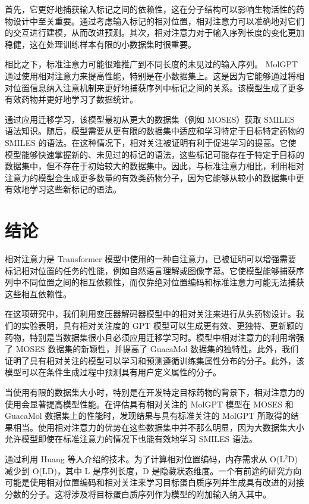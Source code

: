首先，它更好地捕获输入标记之间的依赖性，这在分子结构可以影响生物活性的药物设计中至关重要。通过考虑输入标记的相对位置，相对注意力可以准确地对它们的交互进行建模，从而改进预测。其次，相对注意力对于输入序列长度的变化更加稳健，这在处理训练样本有限的小数据集时很重要。

相比之下，标准注意力可能很难推广到不同长度的未见过的输入序列。 MolGPT 通过使用相对注意力来提高性能，特别是在小数据集上。这是因为它能够通过将相对位置信息纳入注意机制来更好地捕获序列中标记之间的关系。该模型生成了更多有效药物并更好地学习了数据统计。

通过应用迁移学习，该模型最初从更大的数据集（例如 MOSES）获取 SMILES 语法知识。随后，模型需要从更有限的数据集中适应和学习特定于目标特定药物的 SMILES 的语法。在这种情况下，相对关注被证明有利于促进学习的提高。它使模型能够快速掌握新的、未见过的标记的语法，这些标记可能存在于特定于目标的数据集中，但不存在于初始较大的数据集中。因此，与标准注意力相比，利用相对注意力的模型会生成更多数量的有效类药物分子，因为它能够从较小的数据集中更有效地学习这些新标记的语法。

\section{结论}

相对注意力是 Transformer 模型中使用的一种自注意力，已被证明可以增强需要标记相对位置的任务的性能，例如自然语言理解或图像字幕。它使模型能够捕获序列中不同位置之间的相互依赖性，而仅靠绝对位置编码和标准注意力可能无法捕获这些相互依赖性。

在这项研究中，我们利用变压器解码器模型中的相对关注来进行从头药物设计。我们的实验表明，具有相对关注度的 GPT 模型可以生成更有效、更独特、更新颖的药物，特别是当数据集很小且必须应用迁移学习时。模型中相对注意力的利用增强了 MOSES 数据集的新颖性，并提高了 GuacaMol 数据集的独特性。此外，我们证明了具有相对关注的模型可以学习和预测遵循训练集属性分布的分子。此外，该模型可以在条件生成过程中预测具有用户定义属性的分子。

当使用有限的数据集大小时，特别是在开发特定目标药物的背景下，相对注意力的使用会显著提高模型性能。在评估具有相对关注的 MolGPT 模型在 MOSES 和 GuacaMol 数据集上的性能时，发现结果与具有标准关注的 MolGPT 所取得的结果相当。使用相对注意力的优势在这些数据集中并不那么明显，因为大数据集大小允许模型即使在标准注意力的情况下也能有效地学习 SMILES 语法。

通过利用 Huang 等人介绍的技术。为了计算相对位置编码，内存需求从 O(L$^2$D) 减少到 O(LD)，其中 L 是序列长度，D 是隐藏状态维度。一个有前途的研究方向可能是使用相对位置编码和相对关注来学习目标蛋白质序列并生成具有改进的对接分数的分子。这将涉及将目标蛋白质序列作为模型的附加输入纳入其中。

